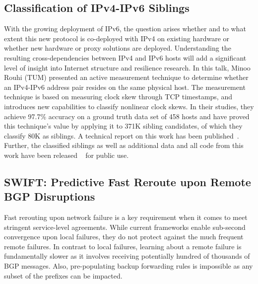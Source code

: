 \subsection{Classification of IPv4-IPv6 Siblings}

With the growing deployment of IPv6, the question arises whether and to what
extent this new protocol is co-deployed with IPv4 on existing hardware or
whether new hardware or proxy solutions are deployed. Understanding the
resulting cross-dependencies between IPv4 and IPv6 hosts will add a
significant level of insight into Internet structure and resilience research.
In this talk, Minoo Rouhi (TUM) presented an active measurement technique to
determine whether an IPv4-IPv6 address pair resides on the same physical host.
The measurement technique is based on measuring clock skew through TCP
timestamps, and introduces new capabilities to classify nonlinear clock skews.
In their studies, they achieve 97.7\% accuracy on a ground truth data set of
458 hosts and have proved this technique's value by applying it to 371K
sibling candidates, of which they classify 80K as siblings. A technical report
on this work has been published~\cite{qscheitle:arxiv:2016}. Further, the
classified siblings as well as additional data and all code from this work
have been released ~\cite{qscheitle:arxiv:2016} for public use.


\subsection{SWIFT\@: Predictive Fast Reroute upon Remote BGP Disruptions}

Fast rerouting upon network failure is a key requirement when it comes to meet
stringent service-level agreements. While current frameworks enable sub-second
convergence upon local failures, they do not protect against the much frequent
remote failures. In contrast to local failures, learning about a remote
failure is fundamentally slower as it involves receiving potentially hundred
of thousands of BGP messages. Also, pre-populating backup forwarding rules is
impossible as any subset of the prefixes can be impacted.

